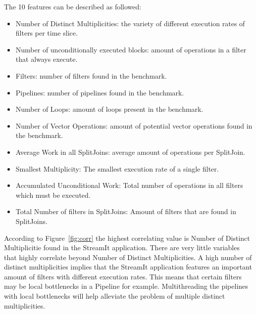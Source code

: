The 10 features can be described as followed:
\begin{itemize}
\item Number of Distinct Multiplicities: the variety of different execution rates of filters per time slice.
\vspace{-1em}
\item Number of unconditionally executed blocks: amount of operations in a filter that always execute.
\vspace{-1em}
\item Filters: number of filters found in the benchmark.
\vspace{-1em}
\item Pipelines: number of pipelines found in the benchmark.
\vspace{-1em}
\item Number of Loops: amount of loops present in the benchmark.
\vspace{-1em}
\item Number of Vector Operations: amount of potential vector operations found in the benchmark.
\vspace{-1em}
\item Average Work in all SplitJoins: average amount of operations per SplitJoin.
\vspace{-1em}
\item Smallest Multiplicity: The smallest execution rate of a single filter.
\vspace{-1em}
\item Accumulated Unconditional Work: Total number of operations in all filters which must be executed.
\vspace{-1em}
\item Total Number of filters in SplitJoins: Amount of filters that are found in SplitJoins.
\end{itemize}

According to Figure~\ref{fig:corr} the highest correlating value is Number of Distinct Multiplicitie found in the StreamIt application.
There are very little variables that highly correlate beyond Number of Distinct Multiplicities.
A high number of distinct multiplicities implies that the StreamIt application features an important amount of filters with different execution rates.
This means that certain filters may be local bottlenecks in a Pipeline for example.
Multithreading the pipelines with local bottlenecks will help alleviate the problem of multiple distinct multiplicities.

